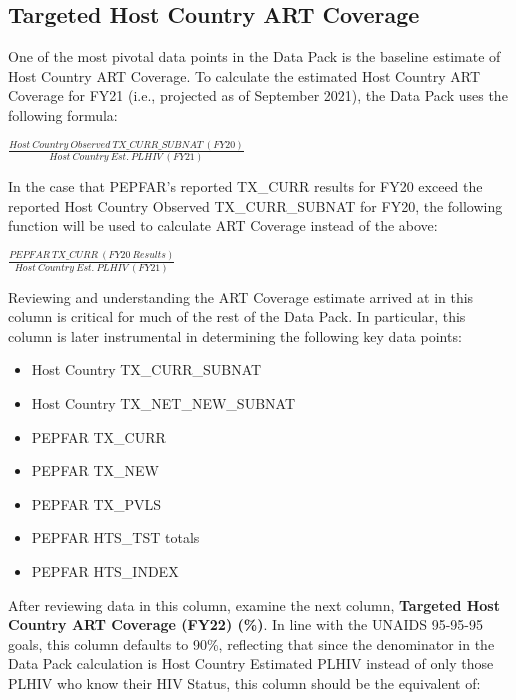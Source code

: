 \documentclass[
  openany]{book}
\begin{document}
\hypertarget{targeted-host-country-art-coverage}{%
\subsection{Targeted Host Country ART Coverage}\label{targeted-host-country-art-coverage}}

One of the most pivotal data points in the Data Pack is the baseline
estimate of Host Country ART Coverage. To calculate the estimated Host
Country ART Coverage for FY21 (i.e., projected as of September 2021),
the Data Pack uses the following formula:

\begin{center} $\frac{Host\ Country\ Observed\ TX\_ CURR\_ SUBNAT\ (FY20)}{Host\ Country\ Est.\ PLHIV\ (FY21)}$ \end{center}

In the case that PEPFAR's reported TX\_CURR results for FY20 exceed the
reported Host Country Observed TX\_CURR\_SUBNAT for FY20, the following
function will be used to calculate ART Coverage instead of the above:

\begin{center} $\frac{PEPFAR\ TX\_ CURR\ (FY20\ Results)}{Host\ Country\ Est.\ PLHIV\ (FY21)}$ \end{center}

Reviewing and understanding the ART Coverage estimate arrived at in this
column is critical for much of the rest of the Data Pack. In particular,
this column is later instrumental in determining the following key data
points:

\begin{itemize}
\item
  Host Country TX\_CURR\_SUBNAT
\item
  Host Country TX\_NET\_NEW\_SUBNAT
\item
  PEPFAR TX\_CURR
\item
  PEPFAR TX\_NEW
\item
  PEPFAR TX\_PVLS
\item
  PEPFAR HTS\_TST totals
\item
  PEPFAR HTS\_INDEX
\end{itemize}

After reviewing data in this column, examine the next column, \textbf{Targeted
Host Country ART Coverage (FY22) (\%)}. In line with the UNAIDS 95-95-95
goals, this column defaults to 90\%, reflecting that since the
denominator in the Data Pack calculation is Host Country Estimated PLHIV
instead of only those PLHIV who know their HIV Status, this column
should be the equivalent of:
\end{document}
